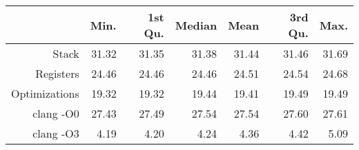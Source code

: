 \begin{table}[ht]
\centering
\begin{tabular}{rrrrrrr}
  \hline
 & Min. & 1st Qu. & Median & Mean & 3rd Qu. & Max. \\ 
  \hline
Stack & 31.32 & 31.35 & 31.38 & 31.44 & 31.46 & 31.69 \\ 
  Registers & 24.46 & 24.46 & 24.46 & 24.51 & 24.54 & 24.68 \\ 
  Optimizations & 19.32 & 19.32 & 19.44 & 19.41 & 19.49 & 19.49 \\ 
  clang -O0 & 27.43 & 27.49 & 27.54 & 27.54 & 27.60 & 27.61 \\ 
  clang -O3 & 4.19 & 4.20 & 4.24 & 4.36 & 4.42 & 5.09 \\ 
   \hline
\end{tabular}
\end{table}
